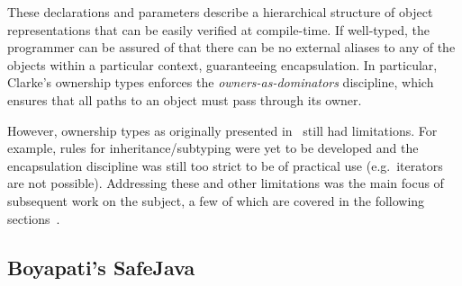 \documentclass{acm_proc_article-sp}
\begin{document}
These declarations and parameters describe a hierarchical structure of object
representations that can be easily verified at compile-time. If well-typed, the
programmer can be assured of that there can be no external aliases to any of
the objects within a particular context, guaranteeing encapsulation. In
particular, Clarke's ownership types enforces the \emph{owners-as-dominators}
discipline, which ensures that all paths to an object must pass through its
owner.

However, ownership types as originally presented in~\cite{clarke98ownership}
still had limitations. For example, rules for inheritance/subtyping were yet to
be developed and the encapsulation discipline was still too strict to be of
practical use (e.g.\ iterators are not possible). Addressing these and other
limitations was the main focus of subsequent work on the subject, a few of
which are covered in the following sections~\cite{boyapati04safejava,
boyapati03innerclass, cunningham08ut, dietl11gut, cameron07mojo}.

%
%
%
%
%
%


\subsection{Boyapati's SafeJava}
\label{subsec:boyapati}
\end{document}
